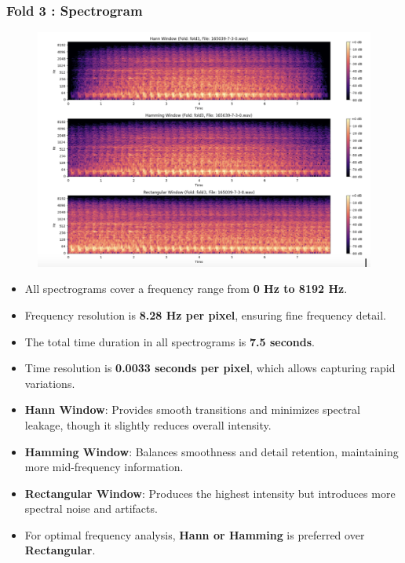 \documentclass[a4paper,12pt]{article}
\begin{document}
    \subsubsection{Fold 3 : Spectrogram}
    \begin{figure}[H]
        \centering
        \includegraphics[width=1\linewidth]{Fold3.png}
    \end{figure}
    \begin{itemize}
        \item All spectrograms cover a frequency range from  \textbf{0 Hz to 8192 Hz}.
        \item Frequency resolution is \textbf{8.28 Hz per pixel}, ensuring fine frequency detail.
        \item The total time duration in all spectrograms is \textbf{7.5 seconds}.
        \item Time resolution is \textbf{0.0033 seconds per pixel}, which allows capturing rapid variations.
        \item \textbf{Hann Window}: Provides smooth transitions and minimizes spectral leakage, though it slightly reduces overall intensity.
        \item \textbf{Hamming Window}: Balances smoothness and detail retention, maintaining more mid-frequency information.
        \item \textbf{Rectangular Window}: Produces the highest intensity but introduces more spectral noise and artifacts.
        \item For optimal frequency analysis, \textbf{Hann or Hamming} is preferred over \textbf{Rectangular}.
    \end{itemize}
\newpage
\end{document}
